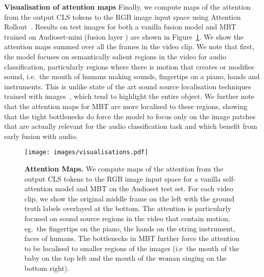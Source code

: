 \noindent\textbf{Visualisation of attention maps}
Finally, we compute maps of the attention from the output CLS tokens to the RGB image input space using Attention Rollout~\cite{abnar2020quantifying}. Results on test images for both a vanilla fusion model and MBT trained on Audioset-mini (fusion layer ) are shown in Figure~\ref{fig:attn}. We show the attention maps summed over all the frames in the video clip. We note that first, the model focuses on semantically salient regions in the video for audio classification, particularly regions where there is motion that creates or modifies sound, i.e.\ the mouth of humans making sounds, fingertips on a piano, hands and instruments. This is unlike state of the art sound source localisation techniques trained with images~\cite{chen2021localizing}, which tend to highlight the entire object. We further note that the attention maps for MBT are more localised to these regions, showing that the tight bottlenecks do force the model to focus only on the image patches that are actually relevant for the audio classification task and which benefit from early fusion with audio. \\
\begin{figure}
    \centering
    \texttt{[image: images/visualisations.pdf]}
    \caption{\textbf{Attention Maps.} We compute maps of the attention from the output CLS tokens to the RGB image input space for a vanilla self-attention model and MBT on the Audioset test set. For each video clip, we show the original middle frame on the left with the ground truth labels overlayed at the bottom. The attention is particularly focused on sound source regions in the video that contain motion, eg.\ the fingertips on the piano, the hands on the string instrument, faces of humans. The bottlenecks in MBT further force the attention to be localised to smaller regions of the images (i.e\ the mouth of the baby on the top left and the mouth of the woman singing on the bottom right). 
    }
    \label{fig:attn}
\end{figure}
